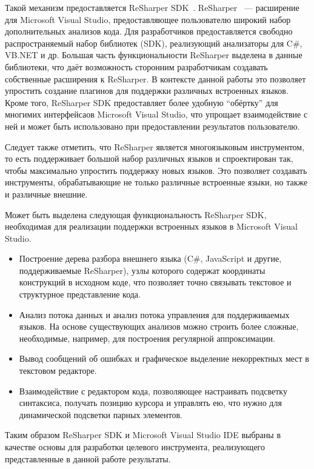 Такой механизм предоставляется ReSharper SDK~\cite{ReSharperSDK}.  ReSharper~\cite{ReSharper} --- расширение для Microsoft Visual Studio, предоставляющее пользователю широкий набор дополнительных анализов кода. Для разработчиков предоставляется свободно распространяемый набор библиотек (SDK), реализующий анализаторы для C\#, VB.NET и др. Большая часть функциональности ReSharper выделена в данные библиотеки, что даёт возможность сторонним разработчикам создавать собственные расширения к ReSharper. В контексте данной работы это позволяет упростить создание плагинов для поддержки различных встроенных языков. Кроме того, ReSharper SDK предоставляет более удобную ``обёртку'' для многимих интерфейсаов Microsoft Visual Studio, что упрощает взаимодействие с ней и может быть использовано при предоставлении результатов пользователю.

Следует также отметить, что ReSharper является многоязыковым инструментом, то есть поддерживает большой набор различных языков и спроектирован так, чтобы максимально упростить поддержку новых языков. Это позволяет создавать инструменты, обрабатывающие не только различные встроенные языки, но также и различные внешние.

Может быть выделена следующая функциональность ReSharper SDK, необходимая для реализации поддержки встроенных языков в Microsoft Visual Studio.  
\begin{itemize}
    \item Построение дерева разбора внешнего языка (C\#, JavaScript и другие, поддерживаемые ReSharper), узлы которого содержат координаты конструкций в исходном коде, что позволяет точно связывать текстовое и структурное представление кода.
    \item Анализ потока данных и анализ потока управления для поддерживаемых языков. На основе существующих анализов можно строить более сложные, необходимые, например, для построения регулярной аппроксимации.
    \item Вывод сообщений об ошибках и графическое выделение некорректных мест в текстовом редакторе.
    \item Взаимодействие с редактором кода, позволяющее настраивать подсветку синтаксиса, получать позицию курсора и управлять ею, что нужно для динамической подсветки парных элементов.
\end{itemize}

Таким образом ReSharper SDK и Microsoft Visual Studio IDE выбраны в качестве основы для разработки целевого инструмента, реализующего представленные в данной работе результаты.

